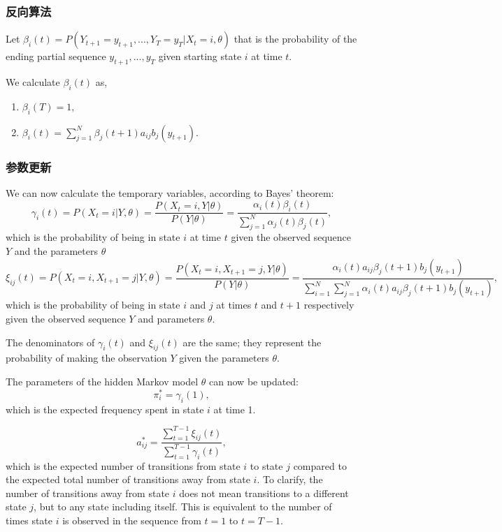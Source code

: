 \subsubsection{反向算法}
Let $\beta _{i}(t)=P(Y_{t+1}=y_{t+1},...,Y_{T}=y_{T}|X_{t}=i,\theta )$ that is the probability of the ending partial sequence
$y_{t+1},...,y_{T}$ given starting state $i$ at time $t$.

We calculate $\beta _{i}(t)$ as,
\begin{enumerate}
    \item $\beta_{i}(T)=1,$
    \item $\beta_{i}(t)=\sum _{j=1}^{N}\beta _{j}(t+1)a_{ij}b_{j}(y_{t+1}).$
\end{enumerate}

\subsubsection{参数更新}
We can now calculate the temporary variables, according to Bayes' theorem:
\[
    \gamma_{i}(t)=P(X_{t}=i|Y,\theta)
                 ={\frac {P(X_{t}=i,Y|\theta)}{P(Y|\theta)}}
                 ={\frac {\alpha_{i}(t)\beta_{i}(t)}{\sum_{j=1}^{N}\alpha_{j}(t)\beta_{j}(t)}},
\]
which is the probability of being in state $i$ at time $t$ given the observed sequence $Y$ and the parameters $\theta$
\[
    \xi _{ij}(t)=P(X_{t}=i,X_{t+1}=j|Y,\theta)
                ={\frac {P(X_{t}=i,X_{t+1}=j,Y|\theta)}{P(Y|\theta)}}
                ={\frac {\alpha_{i}(t)a_{ij}\beta_{j}(t+1)b_{j}(y_{t+1})}{\sum_{i=1}^{N}\sum_{j=1}^{N}\alpha_{i}(t)a_{ij}\beta _{j}(t+1)b_{j}(y_{t+1})}},
\]
which is the probability of being in state $i$ and $j$ at times $t$ and $t+1$ respectively given the observed sequence $Y$
and parameters $\theta$.

The denominators of $\gamma_{i}(t)$ and $\xi_{ij}(t)$ are the same;
they represent the probability of making the observation $Y$ given the parameters $\theta$.

The parameters of the hidden Markov model $\theta$ can now be updated:
\[
    \pi_{i}^{*}=\gamma_{i}(1),
\]
which is the expected frequency spent in state $i$ at time 1.

\[
    a_{ij}^{*}={\frac {\sum_{t=1}^{T-1}\xi_{ij}(t)}{\sum_{t=1}^{T-1}\gamma_{i}(t)}},
\]
which is the expected number of transitions from state $i$ to state $j$ compared to the expected total number of transitions away from state $i$.
To clarify, the number of transitions away from state $i$ does not mean transitions to a different state $j$, but to any state including itself.
This is equivalent to the number of times state $i$ is observed in the sequence from $t=1$ to $t=T−1$.

